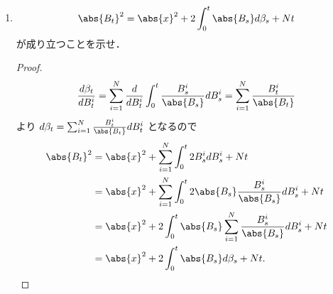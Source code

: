 \documentclass{jsarticle}
\begin{document}
\begin{enumerate}
\begin{proof}
        したがって $\beta$ は $(\clf_t)$-adaptedなCLMである．
        ここで
        \begin{align}
            \gen{\beta, \beta}_t
            &= \gen{\sum_{i=1}^{N}\int_{0}^{\cdot}\frac{B_{s}^{i}}{\abs{B_s}}dB_s^i, \sum_{i=1}^{N}\int_{0}^{\cdot}\frac{B_{s}^{i}}{\abs{B_s}}dB_s^i}_t \\
            &= \sum_{i=1}^{N}\int_{0}^{t}\frac{(B_{s}^{i})^2}{\abs{B_s}^2}ds
            = t
        \end{align}
        が成り立つことより，Thm. 5.12から $\beta$ は0スタートの $(\clf_t)$-BMである．
    \end{proof}
    
    \item
    $$
    \abs{B_t}^2
    = \abs{x}^2+2\int_0^t \abs{B_s}d\beta_s+Nt
    $$
    が成り立つことを示せ．
    \begin{proof}
        \begin{align}
            \frac{d\beta_t}{dB_t^i}
            = \sum_{i=1}^{N}\frac{d}{dB_t^i}\int_0^t\frac{B_{s}^{i}}{\abs{B_s}}dB_s^i
            = \sum_{i=1}^{N}\frac{B_{t}^{i}}{\abs{B_t}}
        \end{align}
        より $d\beta_t=\sum_{i=1}^{N}\frac{B_{t}^{i}}{\abs{B_t}}dB_t^i$ となるので
        \begin{align}
            \abs{B_t}^2
            &= \abs{x}^2
            + \sum_{i=1}^{N}\int_{0}^{t}2B_s^i dB_s^i
            + Nt \\
            &= \abs{x}^2
            + \sum_{i=1}^{N}\int_{0}^{t}2\abs{B_s}\frac{B_{s}^{i}}{\abs{B_s}}dB_s^i
            + Nt \\
            &= \abs{x}^2
            + 2\int_{0}^{t}\abs{B_s}\sum_{i=1}^{N}\frac{B_{s}^{i}}{\abs{B_s}}dB_s^i
            + Nt \\
            &= \abs{x}^2
            + 2\int_{0}^{t}\abs{B_s}d\beta_s
            + Nt.
        \end{align}
    \end{proof}
    

\end{enumerate}
\end{document}
